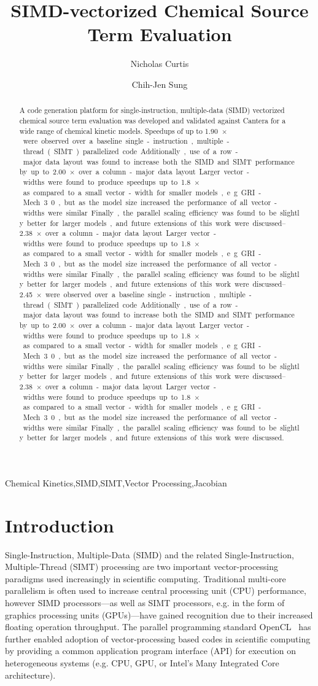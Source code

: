 \documentclass[12pt,number,sort&compress]{elsarticle}
\title{SIMD-vectorized Chemical Source Term Evaluation}
\author[1]{Nicholas Curtis\corref{corr}}
\author[1]{Chih-Jen Sung}
\begin{document}
\begin{frontmatter}

\begin{abstract} %
A code generation platform for single-instruction, multiple-data (SIMD) vectorized chemical source term evaluation was developed and validated against Cantera for a wide range of chemical kinetic models.
Speedups of up to \SIrange{1.90}{2.45}{$\times$} were observed over a baseline single-instruction, multiple-thread (SIMT) parallelized code.
Additionally, use of a row-major data layout was found to increase both the SIMD and SIMT performance by up to \SIrange{2.00}{2.38}{$\times$} over a column-major data layout.
Larger vector-widths were found to produce speedups up to \SI{1.8}{$\times$} as compared to a small vector-width for smaller models, e.g. GRI-Mech 3.0, but as the model size increased the performance of all vector-widths were similar.
Finally, the parallel scaling efficiency was found to be slightly better for larger models, and future extensions of this work were discussed.
\end{abstract}

\begin{keyword}
    Chemical Kinetics\sep SIMD\sep SIMT\sep Vector Processing\sep Jacobian
\end{keyword}

\end{frontmatter}

\section{Introduction}
%

Single-Instruction, Multiple-Data (SIMD) and the related Single-Instruction, Multiple-Thread (SIMT) processing are two important vector-processing paradigms used increasingly in scientific computing.
Traditional multi-core parallelism is often used to increase central processing unit (CPU) performance, however SIMD processors---as well as SIMT processors, e.g. in the form of graphics processing units (GPUs)---have gained recognition due to their increased floating operation throughput.
The parallel programming standard OpenCL~\cite{stone2010opencl} has further enabled adoption of vector-processing based codes in scientific computing by providing a common application program interface (API) for execution on heterogeneous systems (e.g. CPU, GPU, or Intel's Many Integrated Core architecture).
\end{document}
